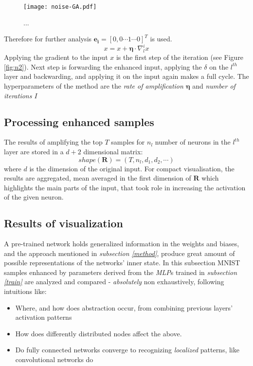 \begin{figure}
    \centering
    \texttt{[image: noise-GA.pdf]}
    \caption{...}
    \label{fig:noise-GA}
\end{figure}

Therefore for further analysis $\mathbf{e_i} = [0, 0 \cdots 1 \cdots 0]^T$ is used.
$$x = x + \mathbf{\eta}\cdot\nabla_l^i x$$
Applying the gradient to the input $x$ is the first step of the iteration (see Figure \ref{fig:n2}). Next step is forwarding the enhanced input, applying the $\delta$ on the $l^{th}$ layer and backwarding, and applying it on the input again makes a full cycle.
The hyperparameters of the method are the \emph{rate of amplification $\mathbf{\eta}$} and \emph{number of iterations $I$}

\subsection{Processing enhanced samples}
The results of amplifying the top $T$ samples for $n_l$ number of neurons in the $l^{th}$ layer are stored in a $d + 2$ dimensional matrix:
$$
    shape(\mathbf{R}) = (T, n_l, d_1, d_2, \cdots)
$$
where $d$ is the dimension of the original input.
For compact visualisation, the results are aggregated, mean averaged in the first dimension of $\mathbf{R}$ which highlights the main parts of the input, that took role in increasing the activation of the given neuron.


\subsection{Results of visualization}

A pre-trained network holds generalized information in the weights and biases, and the approach mentioned in \emph{subsection \ref{method}}, produce great amount of possible representations of the networks' inner state. In this subsection MNIST samples enhanced by parameters derived from the \emph{MLP}s trained in \emph{subsection \ref{train}} are analyzed and compared - \textit{absolutely} non exhaustively, following intuitions like:

\begin{itemize}
    \item Where, and how does abstraction occur, from combining previous layers' activation patterns
    \item How does differently distributed nodes affect the above.
    \item Do fully connected networks converge to recognizing \emph{localized} patterns, like convolutional networks do
\end{itemize}

